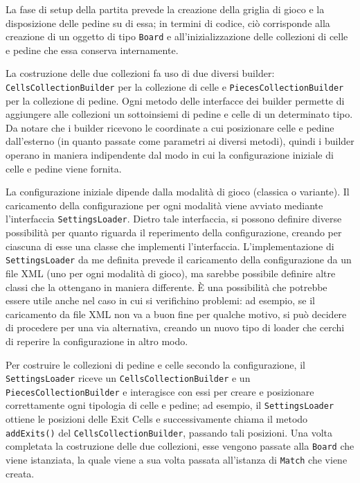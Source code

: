 \documentclass[a4paper,12pt]{report}
\begin{document}
La fase di setup della partita prevede la creazione della griglia di gioco e la disposizione delle pedine su di essa; in termini di codice, ciò corrisponde alla creazione di un oggetto di tipo \texttt{Board} e all'inizializzazione delle collezioni di celle e pedine che essa conserva internamente. 

La costruzione delle due collezioni fa uso di due diversi builder: \\ \texttt{CellsCollectionBuilder} per la collezione di celle e \texttt{PiecesCollectionBuilder} per la collezione di pedine. Ogni metodo delle interfacce dei builder permette di aggiungere alle collezioni un sottoinsiemi di pedine e celle di un determinato tipo. Da notare che i builder ricevono le coordinate a cui posizionare celle e pedine dall'esterno (in quanto passate come parametri ai diversi metodi), quindi i builder operano in maniera indipendente dal modo in cui la configurazione iniziale di celle e pedine viene fornita.

La configurazione iniziale dipende dalla modalità di gioco (classica o variante). Il caricamento della configurazione per ogni modalità viene avviato mediante l'interfaccia \texttt{SettingsLoader}. Dietro tale interfaccia, si possono definire diverse possibilità per quanto riguarda il reperimento della configurazione, creando per ciascuna di esse una classe che implementi l'interfaccia. L'implementazione di \texttt{SettingsLoader} da me definita prevede il caricamento della configurazione da un file XML (uno per ogni modalità di gioco), ma sarebbe possibile definire altre classi che la ottengano in maniera differente. È una possibilità che potrebbe essere utile anche nel caso in cui si verifichino problemi: ad esempio, se il caricamento da file XML non va a buon fine per qualche motivo, si può decidere di procedere per una via alternativa, creando un nuovo tipo di loader che cerchi di reperire la configurazione in altro modo.

Per costruire le collezioni di pedine e celle secondo la configurazione, il \texttt{SettingsLoader} riceve un \texttt{CellsCollectionBuilder} e un \\ \texttt{PiecesCollectionBuilder} e interagisce con essi per creare e posizionare correttamente ogni tipologia di celle e pedine; ad esempio, il \texttt{SettingsLoader} ottiene le posizioni delle Exit Cells e successivamente chiama il metodo \texttt{addExits()} del \texttt{CellsCollectionBuilder}, passando tali posizioni. Una volta completata la costruzione delle due collezioni, esse vengono passate alla \texttt{Board} che viene istanziata, la quale viene a sua volta passata all'istanza di \texttt{Match} che viene creata.
\end{document}
